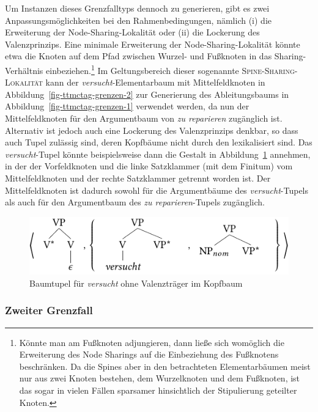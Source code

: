 Um Instanzen dieses Grenzfalltyps dennoch zu generieren, gibt es zwei Anpassungsmöglichkeiten bei den Rahmenbedingungen, nämlich (i) die Erweiterung der Node-Sharing-Lokalität oder (ii) die Lockerung des Valenzprinzips. Eine minimale Erweiterung der Node-Sharing-Lokalität könnte etwa die Knoten auf dem Pfad zwischen Wurzel- und Fu\ss knoten in das Sharing-Verhältnis einbeziehen.\footnote{Könnte man am Fu\ss knoten adjungieren, dann lie\ss e sich womöglich die Erweiterung des Node Sharings auf die Einbeziehung des Fu\ss knotens beschränken. Da die Spines aber in den betrachteten Elementarbäumen meist nur aus zwei Knoten bestehen, dem Wurzelknoten und dem Fu\ss knoten, ist das  sogar in vielen Fällen sparsamer hinsichtlich der Stipulierung geteilter Knoten.} Im Geltungsbereich dieser sogenannte \textsc{Spine-Sharing-Lokalität} kann der {\it versucht}-Elementarbaum mit Mittelfeldknoten in Abbildung~\ref{fig-ttmctag-grenzen-2} zur Generierung des Ableitungsbaums in Abbildung~\ref{fig-ttmctag-grenzen-1} verwendet werden, da nun der Mittelfeldknoten für den Argumentbaum von {\it zu reparieren} zugänglich ist. Alternativ ist jedoch auch eine Lockerung des Valenzprinzips denkbar, so dass auch Tupel zulässig sind, deren Kopfbäume nicht durch den  lexikalisiert sind. Das {\it versucht}-Tupel könnte beispielsweise dann die Gestalt in Abbildung~\ref{fig-ttmctag-grenzen-1-2} annehmen, in der der Vorfeldknoten und die linke Satzklammer (mit dem Finitum) vom Mittelfeldknoten und der rechte Satzklammer getrennt worden ist. Der Mittelfeldknoten ist dadurch sowohl für die Argumentbäume des {\it versucht}-Tupels als auch für den Argumentbaum des {\it zu reparieren}-Tupels zugänglich. 

\begin{figure}[t]
\centering
\includegraphics{graphics/abb730.pdf}
\caption{\label{fig-ttmctag-grenzen-1-2}Baumtupel für {\it versucht} ohne Valenzträger im Kopfbaum}
\end{figure}   


\subsubsection*{Zweiter Grenzfall}

